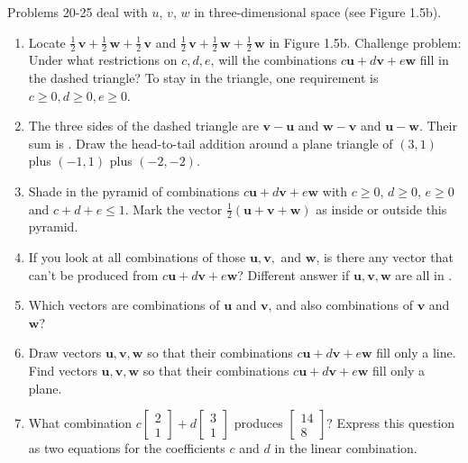 \documentclass[14pt, a4paper]{article}
\begin{document}
\noindent Problems 20-25 deal with $u$, $v$, $w$ in three-dimensional space (see Figure 1.5b).

\begin{enumerate}[resume]
    \item Locate $\frac{1}{2}\,\boldsymbol{v} + \frac{1}{2}\,\boldsymbol{w} + \frac{1}{2}\,\boldsymbol{v}$ and $\frac{1}{2}\,\boldsymbol{v} + \frac{1}{2}\,\boldsymbol{w} + \frac{1}{2}\,\boldsymbol{w}$ in Figure 1.5b. Challenge problem: Under what restrictions on $c, d, e$, will the combinations $c\boldsymbol{u} + d\boldsymbol{v} + e\boldsymbol{w}$ fill in the dashed triangle? To stay in the triangle, one requirement is $c \ge 0, d \ge 0, e \ge 0$.

    \item The three sides of the dashed triangle are $\boldsymbol{v} - \boldsymbol{u}$ and $\boldsymbol{w} - \boldsymbol{v}$ and $\boldsymbol{u} - \boldsymbol{w}$. Their sum is \underline{\hspace{2cm}}. Draw the head-to-tail addition around a plane triangle of $(3,1)$ plus $(-1,1)$ plus $(-2,-2)$.

    \item Shade in the pyramid of combinations $c\boldsymbol{u} + d\boldsymbol{v} + e\boldsymbol{w}$ with $c \ge 0$, $d \ge 0$, $e \ge 0$ and $c + d + e \le 1$. Mark the vector $\frac{1}{2}(\boldsymbol{u} + \boldsymbol{v} + \boldsymbol{w})$ as inside or outside this pyramid.

    \item If you look at all combinations of those $\boldsymbol{u}, \boldsymbol{v},$ and $\boldsymbol{w}$, is there any vector that can't be produced from $c\boldsymbol{u} + d\boldsymbol{v} + e\boldsymbol{w}$? Different answer if $\boldsymbol{u}, \boldsymbol{v}, \boldsymbol{w}$ are all in \underline{\hspace{2cm}}.

    \item Which vectors are combinations of $\boldsymbol{u}$ and $\boldsymbol{v}$, and also combinations of $\boldsymbol{v}$ and $\boldsymbol{w}$?

    \item Draw vectors $\boldsymbol{u}, \boldsymbol{v}, \boldsymbol{w}$ so that their combinations $c\boldsymbol{u} + d\boldsymbol{v} + e\boldsymbol{w}$ fill only a line. Find vectors $\boldsymbol{u}, \boldsymbol{v}, \boldsymbol{w}$ so that their combinations $c\boldsymbol{u} + d\boldsymbol{v} + e\boldsymbol{w}$ fill only a plane.

    \item What combination $c\begin{bmatrix} 2 \\ 1 \end{bmatrix} + d\begin{bmatrix} 3 \\ 1 \end{bmatrix}$ produces $\begin{bmatrix} 14 \\ 8 \end{bmatrix}$? Express this question as two equations for the coefficients $c$ and $d$ in the linear combination.
\end{enumerate}
\end{document}
